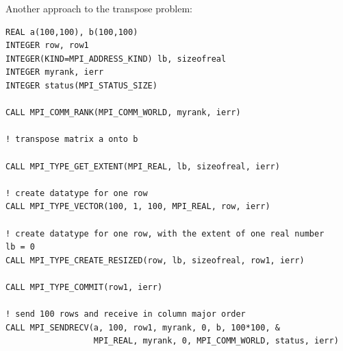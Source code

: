 \begin{example}
\label{pt2pt-exFF}
%
%
Another approach to the transpose problem:
\begin{lstlisting}[language={[MPI]Fortran}]
REAL a(100,100), b(100,100)
INTEGER row, row1
INTEGER(KIND=MPI_ADDRESS_KIND) lb, sizeofreal
INTEGER myrank, ierr
INTEGER status(MPI_STATUS_SIZE)

CALL MPI_COMM_RANK(MPI_COMM_WORLD, myrank, ierr)

! transpose matrix a onto b

CALL MPI_TYPE_GET_EXTENT(MPI_REAL, lb, sizeofreal, ierr)

! create datatype for one row
CALL MPI_TYPE_VECTOR(100, 1, 100, MPI_REAL, row, ierr)

! create datatype for one row, with the extent of one real number
lb = 0
CALL MPI_TYPE_CREATE_RESIZED(row, lb, sizeofreal, row1, ierr)

CALL MPI_TYPE_COMMIT(row1, ierr)

! send 100 rows and receive in column major order
CALL MPI_SENDRECV(a, 100, row1, myrank, 0, b, 100*100, &
                  MPI_REAL, myrank, 0, MPI_COMM_WORLD, status, ierr)
\end{lstlisting}
\end{example}



